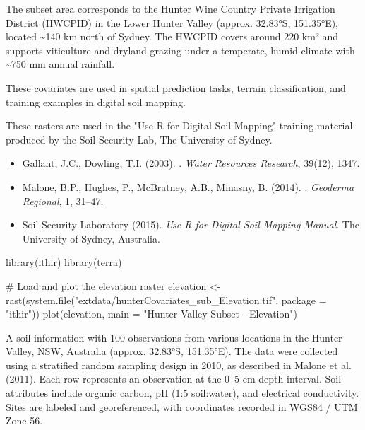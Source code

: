 \documentclass[a4paper]{book}
\begin{document}
%
\begin{Details}
The subset area corresponds to the Hunter Wine Country Private Irrigation District (HWCPID) in the Lower Hunter Valley (approx. 32.83°S, 151.35°E), located \textasciitilde{}140 km north of Sydney. The HWCPID covers around 220 km² and supports viticulture and dryland grazing under a temperate, humid climate with \textasciitilde{}750 mm annual rainfall.

These covariates are used in spatial prediction tasks, terrain classification, and training examples in digital soil mapping.
\end{Details}
%
\begin{Note}
These rasters are used in the "Use R for Digital Soil Mapping" training material produced by the Soil Security Lab, The University of Sydney.
\end{Note}
%
\begin{References}
\begin{itemize}

\item{} Gallant, J.C., Dowling, T.I. (2003). . \emph{Water Resources Research}, 39(12), 1347.
\item{} Malone, B.P., Hughes, P., McBratney, A.B., Minasny, B. (2014). . \emph{Geoderma Regional}, 1, 31–47.
\item{} Soil Security Laboratory (2015). \emph{Use R for Digital Soil Mapping Manual}. The University of Sydney, Australia.

\end{itemize}

\end{References}
%
\begin{Examples}
\begin{ExampleCode}
library(ithir)
library(terra)

# Load and plot the elevation raster
elevation <- rast(system.file("extdata/hunterCovariates_sub_Elevation.tif", package = "ithir"))
plot(elevation, main = "Hunter Valley Subset - Elevation")
\end{ExampleCode}
\end{Examples}
%
\begin{Description}
A soil information  with 100 observations from various locations in the Hunter Valley, NSW, Australia (approx. 32.83°S, 151.35°E). The data were collected using a stratified random sampling design in 2010, as described in Malone et al. (2011). Each row represents an observation at the 0–5 cm depth interval. Soil attributes include organic carbon, pH (1:5 soil:water), and electrical conductivity. Sites are labeled and georeferenced, with coordinates recorded in WGS84 / UTM Zone 56.
\end{Description}
\end{document}
